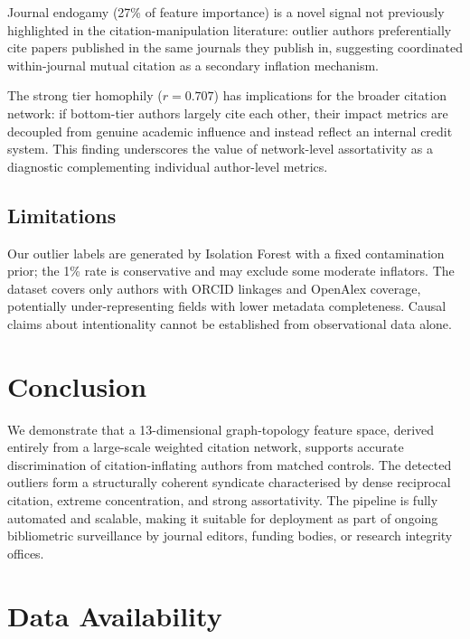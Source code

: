 \documentclass[12pt,a4paper]{article}
\begin{document}
Journal endogamy (27\% of feature importance) is a novel signal
not previously highlighted in the citation-manipulation literature:
outlier authors preferentially cite papers published in the same
journals they publish in, suggesting coordinated within-journal
mutual citation as a secondary inflation mechanism.

The strong tier homophily ($r = 0.707$) has implications for the
broader citation network: if bottom-tier authors largely cite each
other, their impact metrics are decoupled from genuine academic
influence and instead reflect an internal credit system.
This finding underscores the value of network-level assortativity
as a diagnostic complementing individual author-level metrics.

\subsection*{Limitations}

Our outlier labels are generated by Isolation Forest with a fixed
contamination prior; the 1\% rate is conservative and may exclude
some moderate inflators.
The dataset covers only authors with ORCID linkages and
OpenAlex coverage, potentially under-representing fields with lower
metadata completeness.
Causal claims about intentionality cannot be established from
observational data alone.

\section{Conclusion}\label{sec:conclusion}

We demonstrate that a 13-dimensional graph-topology feature space,
derived entirely from a large-scale weighted citation network,
supports accurate discrimination of citation-inflating authors from
matched controls.
The detected outliers form a structurally coherent syndicate
characterised by dense reciprocal citation, extreme concentration,
and strong assortativity.
The pipeline is fully automated and scalable, making it suitable
for deployment as part of ongoing bibliometric surveillance by
journal editors, funding bodies, or research integrity offices.

\section*{Data Availability}
\end{document}
